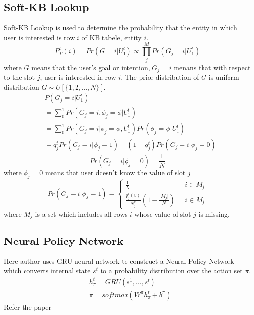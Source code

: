 \documentclass[11pt]{article}
\begin{document}
\subsection{Soft-KB Lookup}
Soft-KB Lookup is used to determine the probability that the entity in which user is interested is row $i$ of KB tabele, entity $i$. 
\begin{equation}
P^t_{\Gamma}(i)=Pr(G=i\vert U^t_1) \propto \prod^M_j Pr(G_j=i\vert U^t_1)
\end{equation}
where $G$ means that the user's goal or intention, $G_j=i$ menans that with respect to the slot $j$, user is interested in row $i$. The prior distribution of $G$ is uniform distribution $G\sim U[\{1,2,...,N\}]$.
\begin{equation}
\begin{split}
&  P(G_j=i\vert U^t_1)\\
& =\sum^1_0 Pr(G_j=i,\phi_j=\phi\vert U^t_1)\\
& =\sum^1_0 Pr(G_j=i\vert \phi_j=\phi, U^t_1)Pr(\phi_j=\phi\vert U^t_1)\\
& =q^t_j Pr(G_j=i\vert \phi_j=1)+(1-q^t_j)Pr(G_j=i\vert \phi_j=0)
\end{split}
\end{equation}
\begin{equation}
Pr(G_j=i\vert \phi_j=0)=\frac{1}{N}
\end{equation}
where $\phi_j=0$ means that user doesn't know the value of slot $j$
\begin{equation}
Pr(G_j=i\vert \phi_j=1)=\left \{\begin{array}{ll}
\frac{1}{N} & \mbox{ $i\in M_j$}\\
\frac{p^t_j(v)}{N^v_j}(1-\frac{\vert M_j \vert}{N}) & \mbox{ $i\in M_j$} 
\end{array} \right.
\end{equation}
where $M_j$ is a set which includes all rows $i$ whose value of slot $j$ is missing.
\subsection{Neural Policy Network}
Here author uses GRU neural network to construct a Neural Policy Network which converts internal state $s^t$ to a probability distribution over the action set $\pi$.
\begin{equation}
\begin{split}
& h^t_{\pi}=GRU(s^1,...,s^t)\\
& \pi=softmax(W^{\pi}h^t_{\pi}+b^{\pi})
\end{split}
\end{equation}
Refer the paper \cite{DBLP:journals/corr/DhingraLLGCAD16}

\end{document}
